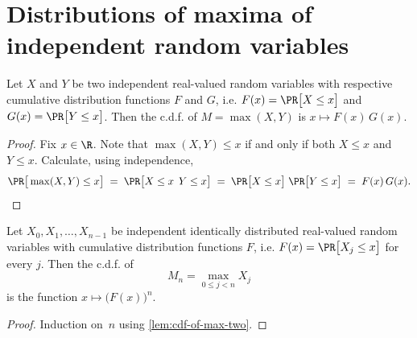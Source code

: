 \section{Distributions of maxima of independent random variables}


\begin{lemma}
  \label{lem:cdf-of-max-two}
  Let $X$ and $Y$ be two independent real-valued random variables with respective
  cumulative distribution functions $F$ and $G$,
  i.e. $F(x) = \PR \big[ X \le x \big]$ and $G(x) = \PR \big[ Y \le x \big]$.
  Then the c.d.f. of $M = \max (X, Y)$ is $x \mapsto F(x) \, G(x)$.
\end{lemma}
\begin{proof}
  \uses{}
  Fix $x \in \R$. Note that $\max (X, Y) \le x$ if and only if both $X \le x$ and $Y \le x$.
  Calculate, using independence,
  \begin{align*}
  \PR\big[ \max (X, Y) \le x \big]
  \; = \; \PR\big[ X \le x \, \; Y \le x \big]
  \; = \; \PR\big[ X \le x \big] \; \PR\big[ Y \le x \big]
  \; = \; F(x) \, G(x) .
  \end{align*}
\end{proof}

\begin{lemma}
  \label{lem:cdf-of-max-many}
  Let $X_0, X_1, \ldots, X_{n-1}$ be independent identically distributed real-valued random variables
  with cumulative distribution functions $F$,
  i.e. $F(x) = \PR \big[ X_j \le x \big]$ for every $j$.
  Then the c.d.f. of \[ M_n = \max_{0 \le j < n} X_j\] is the function $x \mapsto \big(F(x)\big)^n$.
\end{lemma}
\begin{proof}
  Induction on~$n$ using \ref{lem:cdf-of-max-two}.
\end{proof}

